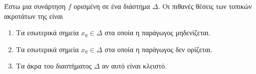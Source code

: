 Έστω μια συνάρτηση $ f $ ορισμένη σε ένα διάστημα $ \Delta $. Οι πιθανές θέσεις των τοπικών ακροτάτων της είναι
\begin{enumerate}
\item Τα εσωτερικά σημεία $ x_0\in\Delta $ στα οποία η παράγωγος μηδενίζεται.
\item Τα εσωτερικά σημεία $ x_0\in\Delta $ στα οποία η παράγωγος δεν ορίζεται.
\item Τα άκρα του διαστήματος $ \Delta $ αν αυτό είναι κλειστό.
\end{enumerate}
